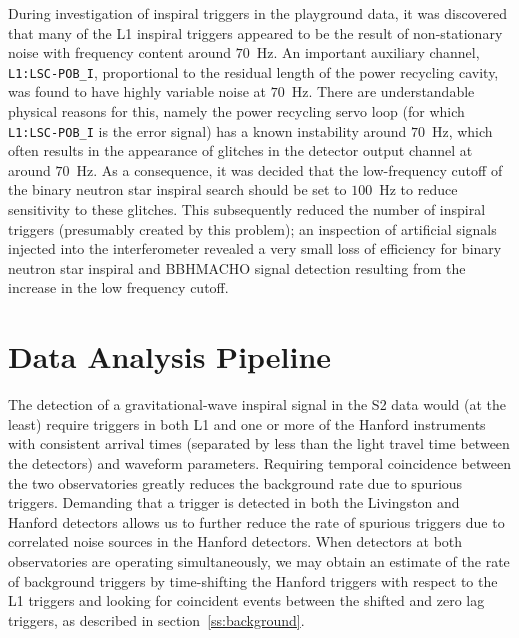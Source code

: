 During investigation of inspiral triggers in the playground data, it was
discovered that many of the L1 inspiral triggers appeared to be the result of
non-stationary noise with frequency content around $70$~Hz.  An important
auxiliary channel, \texttt{L1:LSC-POB\_I}, proportional to the residual length
of the power recycling cavity, was found to have highly variable noise at
$70$~Hz.  There are understandable physical reasons for this, namely the power
recycling servo loop (for which \texttt{L1:LSC-POB\_I} is the error signal)
has a known instability around $70$~Hz, which often results in the appearance
of glitches in the detector output channel at around $70$~Hz.  As a
consequence, it was decided that the low-frequency cutoff of the binary
neutron star inspiral search should be set to $100$~Hz to reduce sensitivity
to these glitches.  This subsequently reduced the number of inspiral triggers
(presumably created by this problem); an inspection of artificial signals
injected into the interferometer revealed a very small loss of efficiency for
binary neutron star inspiral and BBHMACHO signal detection resulting from the
increase in the low frequency cutoff.

\section{Data Analysis Pipeline}
\label{s:pipeline}

The detection of a gravitational-wave inspiral signal in the S2 data would
(at the least) require triggers in both L1 and one or more of the Hanford
instruments with consistent arrival times (separated by less than the light
travel time between the detectors) and waveform parameters.  Requiring
temporal coincidence between the two observatories greatly reduces the
background rate due to spurious triggers. Demanding that a trigger is
detected in both the Livingston and Hanford detectors allows us to further
reduce the rate of spurious triggers due to correlated noise sources in the
Hanford detectors. When detectors at both observatories are operating
simultaneously, we may obtain an estimate of the rate of background triggers
by time-shifting the Hanford triggers with respect to the L1 triggers and
looking for coincident events between the shifted and zero lag triggers, as
described in section~\ref{ss:background}. 


